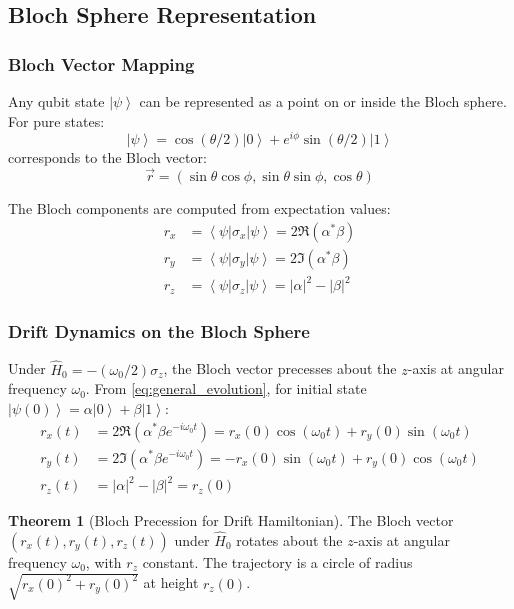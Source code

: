 \documentclass[11pt,a4paper]{article}
\theoremstyle{definition}
\newtheorem{theorem}{Theorem}[section]
\theoremstyle{remark}
\newcommand{\ket}[1]{\left|#1\right\rangle}
\newcommand{\bra}[1]{\left\langle#1\right|}
\begin{document}
\subsection{Bloch Sphere Representation}

\subsubsection{Bloch Vector Mapping}

Any qubit state $\ket{\psi}$ can be represented as a point on or inside the Bloch sphere. For pure states:
\begin{equation}
\ket{\psi} = \cos(\theta/2) \ket{0} + e^{i\phi} \sin(\theta/2) \ket{1}
\end{equation}
corresponds to the Bloch vector:
\begin{equation}
\vec{r} = (\sin\theta \cos\phi, \sin\theta \sin\phi, \cos\theta)
\end{equation}

The Bloch components are computed from expectation values:
\begin{align}
r_x &= \bra{\psi} \sigma_x \ket{\psi} = 2 \Re(\alpha^* \beta) \\
r_y &= \bra{\psi} \sigma_y \ket{\psi} = 2 \Im(\alpha^* \beta) \\
r_z &= \bra{\psi} \sigma_z \ket{\psi} = |\alpha|^2 - |\beta|^2
\end{align}

\subsubsection{Drift Dynamics on the Bloch Sphere}

Under $\hat{H}_0 = -(\omega_0/2) \sigma_z$, the Bloch vector precesses about the $z$-axis at angular frequency $\omega_0$. From \eqref{eq:general_evolution}, for initial state $\ket{\psi(0)} = \alpha \ket{0} + \beta \ket{1}$:
\begin{align}
r_x(t) &= 2 \Re\left(\alpha^* \beta e^{-i \omega_0 t}\right) = r_x(0) \cos(\omega_0 t) + r_y(0) \sin(\omega_0 t) \\
r_y(t) &= 2 \Im\left(\alpha^* \beta e^{-i \omega_0 t}\right) = -r_x(0) \sin(\omega_0 t) + r_y(0) \cos(\omega_0 t) \\
r_z(t) &= |\alpha|^2 - |\beta|^2 = r_z(0)
\end{align}

\begin{theorem}[Bloch Precession for Drift Hamiltonian]
The Bloch vector $(r_x(t), r_y(t), r_z(t))$ under $\hat{H}_0$ rotates about the $z$-axis at angular frequency $\omega_0$, with $r_z$ constant. The trajectory is a circle of radius $\sqrt{r_x(0)^2 + r_y(0)^2}$ at height $r_z(0)$.
\end{theorem}
\end{document}
